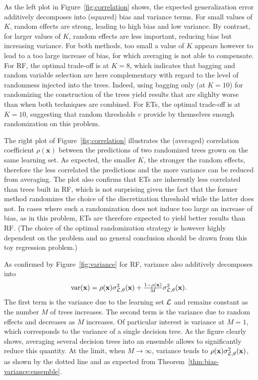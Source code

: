 As the left plot in Figure~\ref{fig:correlation} shows,  the expected
generalization error additively decomposes into (squared) bias and variance
terms.  For small values of $K$, random effects are strong, leading to high
bias and low variance. By contrast, for larger values of $K$, random effects
are less important, reducing bias but increasing variance.   For both methods,
too small a value of $K$ appears however to lead to a too large increase of
bias, for which averaging is not able to compensate. For RF, the optimal
trade-off is at $K=8$, which indicates that bagging and random variable selection are
here complementary with regard to the level of randomness injected into the
trees. Indeed, using bagging only (at $K=10$) for randomizing the construction
of the trees yield results that are slighlty worse than when both techniques
are combined. For ETs, the optimal trade-off is at $K=10$, suggesting that
random thresholds $v$ provide by themselves enough randomization on this
problem.

The right plot of Figure~\ref{fig:correlation} illustrates the (averaged)
correlation coefficient $\rho(\mathbf{x})$ between the predictions of two
randomized trees grown on the same learning set. As expected, the smaller $K$,
the stronger the random effects, therefore the less correlated the predictions
and the more variance can be reduced from averaging. The plot also confirms
that ETs are inherently less correlated than trees built
in RF, which is not surprising given the fact that the former
method randomizes the choice of the discretization threshold while the latter
does not. In cases where such a randomization does not induce too large an
increase of bias, as in this problem, ETs are therefore
expected to yield better results than RF.  (The choice of the
optimal randomization strategy is however highly dependent on the problem and
no general conclusion should be drawn from this toy regression problem.)

As confirmed by Figure~\ref{fig:variance} for RF, variance also additively decomposes  into
\begin{equation}
\text{var}(\mathbf{x}) = \rho(\mathbf{x}) \sigma^2_{{\cal L},\theta}(\mathbf{x}) + \tfrac{1 - \rho(\mathbf{x})}{M} \sigma^2_{{\cal L},\theta}(\mathbf{x}).
\end{equation}
The first term is the variance due to the learning set ${\cal L}$ and remains
constant as the number $M$ of trees increases. The second term is the variance
due to random effects and decreases as $M$ increases. Of particular interest is
variance at $M=1$, which corresponds to the variance of a single decision tree.
As the figure clearly shows, averaging several decision trees into an ensemble
allows to significantly reduce this quantity. At the limit, when $M\to \infty$,
variance tends to $\rho(\mathbf{x}) \sigma^2_{{\cal L},\theta}(\mathbf{x})$, as shown by
the dotted line and as expected from Theorem~\ref{thm:bias-variance:ensemble}.



